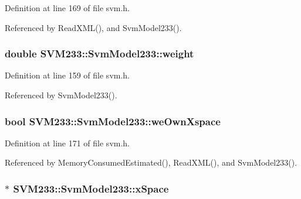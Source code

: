 Definition at line 169 of file svm.\+h.



Referenced by Read\+X\+M\+L(), and Svm\+Model233().

\subsubsection[{\texorpdfstring{weight}{weight}}]{\setlength{\rightskip}{0pt plus 5cm}double S\+V\+M233\+::\+Svm\+Model233\+::weight}\hypertarget{struct_s_v_m233_1_1_svm_model233_a7f0784489eceb20df14806a4e2216529}{}\label{struct_s_v_m233_1_1_svm_model233_a7f0784489eceb20df14806a4e2216529}


Definition at line 159 of file svm.\+h.



Referenced by Svm\+Model233().

\subsubsection[{\texorpdfstring{we\+Own\+Xspace}{weOwnXspace}}]{\setlength{\rightskip}{0pt plus 5cm}bool S\+V\+M233\+::\+Svm\+Model233\+::we\+Own\+Xspace}\hypertarget{struct_s_v_m233_1_1_svm_model233_a1dcd1de97cebd304cfa1249a40a8b39f}{}\label{struct_s_v_m233_1_1_svm_model233_a1dcd1de97cebd304cfa1249a40a8b39f}


Definition at line 171 of file svm.\+h.



Referenced by Memory\+Consumed\+Estimated(), Read\+X\+M\+L(), and Svm\+Model233().

\subsubsection[{\texorpdfstring{x\+Space}{xSpace}}]{$\ast$ S\+V\+M233\+::\+Svm\+Model233\+::x\+Space}\hypertarget{struct_s_v_m233_1_1_svm_model233_aec965ac6b8e424d39f043a20a6a9b0ed}{}\label{struct_s_v_m233_1_1_svm_model233_aec965ac6b8e424d39f043a20a6a9b0ed}


